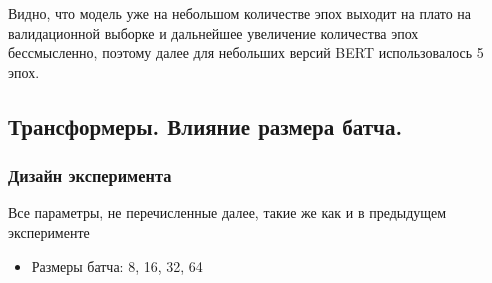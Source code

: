 \documentclass{article}
\begin{document}
\begin{figure}[h]
	\caption{\centering}
	\label{eq:exp5_fig1}
\end{figure}


Видно, что модель уже на небольшом количестве эпох выходит на плато на валидационной выборке и дальнейшее увеличение количества эпох бессмысленно, поэтому далее для небольших версий  BERT использовалось 5 эпох.

\subsection{Трансформеры. Влияние размера батча.}
\subsubsection{Дизайн эксперимента}
Все параметры, не перечисленные далее, такие же как и в предыдущем эксперименте
\begin{itemize}
    \item Размеры батча: 8, 16, 32, 64
\end{itemize}
\end{document}

